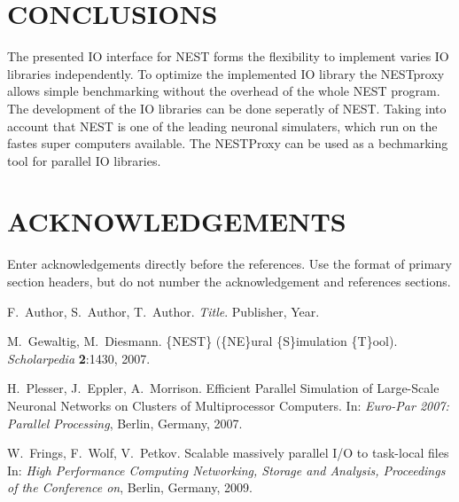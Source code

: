 \documentclass[]{YIC2015}
\begin{document}
\section{CONCLUSIONS}
The presented IO interface for NEST forms the flexibility to implement varies IO libraries independently.
To optimize the implemented IO library the NESTproxy allows simple benchmarking without the overhead of the whole NEST program.
The development of the IO libraries can be done seperatly of NEST.
Taking into account that NEST is one of the leading neuronal simulaters, which run on the fastes super computers available.
The NESTProxy can be used as a bechmarking tool for parallel IO libraries.

\section*{ACKNOWLEDGEMENTS}
Enter acknowledgements directly before the references. Use the format of primary section headers, but do not number the acknowledgement and references sections.


\begin{thebibliography}{99}

F.~Author, S.~Author, T.~Author. \textit{Title}. Publisher, Year.

M.~Gewaltig, M.~Diesmann. \{NEST\} (\{NE\}ural \{S\}imulation \{T\}ool). \textit{Scholarpedia} %
\textbf{2}:1430, 2007.

H.~Plesser, J.~Eppler, A.~Morrison. Efficient Parallel Simulation of Large-Scale
                  Neuronal Networks on Clusters of Multiprocessor
                  Computers. In: \textit{Euro-Par 2007: Parallel Processing}, Berlin, Germany, 2007.
                  
W.~Frings, F.~Wolf, V.~Petkov. Scalable massively parallel I/O to task-local files
 In: \textit{High Performance Computing Networking, Storage and Analysis, Proceedings of the Conference on}, Berlin, Germany, 2009.


\end{thebibliography}

\end{document}
